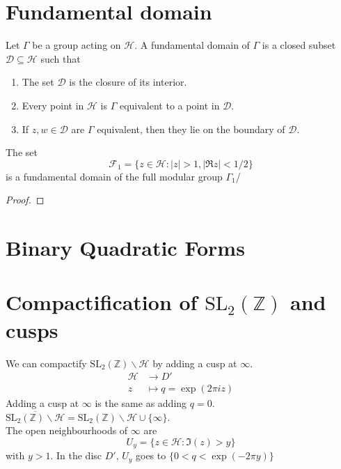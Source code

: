 \documentclass[oneside, 12pt]{scrbook}
\newcommand{\ZZ}{\mathbb Z}
\newcommand{\SL}{\mathrm{SL}}
\newcommand{\bs}{\backslash}
\newcommand{\Hh}{\mathcal{H}}
\theoremstyle{theorem}
\begin{document}
\section{Fundamental domain}

\begin{definition}
Let $\Gamma$ be a group acting on $\Hh$. A fundamental domain of $\Gamma$ is a closed subset $\mathcal{D} \subseteq \Hh$ such that 
\begin{enumerate}
\item The set $\mathcal{D}$ is the closure of its interior.
\item Every point in $\Hh$ is $\Gamma$ equivalent to a point in $\mathcal{D}$.
\item If $z,w \in \mathcal{D}$ are $\Gamma$ equivalent, then they lie on the boundary of $\mathcal{D}$.
\end{enumerate}
\end{definition}

\begin{proposition}
The set $$\mathcal{F}_{1} =\{z \in \Hh : |z|>1 , |\mathfrak{R}z|<1/2\}$$ is a fundamental domain of the full modular group $\Gamma_{1}$/
\end{proposition}

\begin{proof}

\end{proof}


\section{Binary Quadratic Forms}

\section{Compactification of $\SL_{2}(\ZZ)$ and cusps}

We can compactify $\SL_{2}(\ZZ) \bs \Hh$ by adding a cusp at $\infty$. 
\begin{align*}
\Hh &\rightarrow D' \\
z &\mapsto q=\exp(2\pi i z)
\end{align*}
Adding a cusp at $\infty$ is the same as adding $q=0$. $\overline{\SL_{2}(\ZZ)\bs \Hh} = \SL_{2}(\ZZ)\bs \Hh \cup \{\infty\}$. \\

The open neighbourhoods of $\infty$ are $$U_{y} = \{z \in \Hh : \mathfrak{I}(z)>y\}$$ with $y>1$. In the disc $D'$, $U_{y}$ goes to $\{0 < q < \exp(-2\pi y)\}$
\end{document}
